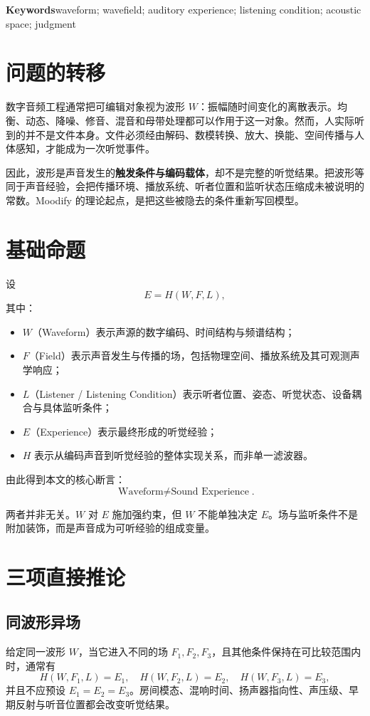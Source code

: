 \documentclass[10pt,a4paper]{article}
\newcommand{\term}[1]{\textbf{#1}}
\begin{document}
\textbf{Keywords}\quad waveform; wavefield; auditory experience; listening condition; acoustic space; judgment

\section{问题的转移}
数字音频工程通常把可编辑对象视为波形 $W$：振幅随时间变化的离散表示。均衡、动态、降噪、修音、混音和母带处理都可以作用于这一对象。然而，人实际听到的并不是文件本身。文件必须经由解码、数模转换、放大、换能、空间传播与人体感知，才能成为一次听觉事件。

因此，波形是声音发生的\term{触发条件与编码载体}，却不是完整的听觉结果。把波形等同于声音经验，会把传播环境、播放系统、听者位置和监听状态压缩成未被说明的常数。Moodify 的理论起点，是把这些被隐去的条件重新写回模型。

\section{基础命题}
设
\begin{equation}
E=H(W,F,L),
\end{equation}
其中：
\begin{itemize}
\item $W$（Waveform）表示声源的数字编码、时间结构与频谱结构；
\item $F$（Field）表示声音发生与传播的场，包括物理空间、播放系统及其可观测声学响应；
\item $L$（Listener / Listening Condition）表示听者位置、姿态、听觉状态、设备耦合与具体监听条件；
\item $E$（Experience）表示最终形成的听觉经验；
\item $H$ 表示从编码声音到听觉经验的整体实现关系，而非单一滤波器。
\end{itemize}

由此得到本文的核心断言：
\begin{equation}
\boxed{\text{Waveform}\neq\text{Sound Experience}}.
\end{equation}

两者并非无关。$W$ 对 $E$ 施加强约束，但 $W$ 不能单独决定 $E$。场与监听条件不是附加装饰，而是声音成为可听经验的组成变量。

\section{三项直接推论}
\subsection{同波形异场}
给定同一波形 $W$，当它进入不同的场 $F_1,F_2,F_3$，且其他条件保持在可比较范围内时，通常有
\begin{equation}
H(W,F_1,L)=E_1,\quad H(W,F_2,L)=E_2,\quad H(W,F_3,L)=E_3,
\end{equation}
并且不应预设 $E_1=E_2=E_3$。房间模态、混响时间、扬声器指向性、声压级、早期反射与听音位置都会改变听觉结果。
\end{document}
